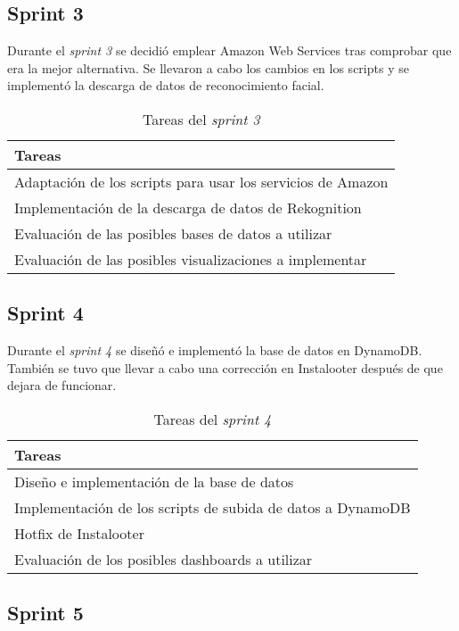 \subsection{Sprint 3}
Durante el \textit{sprint 3} se decidió emplear Amazon Web Services tras comprobar que era la mejor alternativa. Se llevaron a cabo los cambios en los scripts y se implementó la descarga de datos de reconocimiento facial.

\begin{table}[H]
    \centering
    \begin{tabular}{l}
    \hline
    \textbf{Tareas} \\ \hline
    Adaptación de los scripts para usar los servicios de Amazon \\
    Implementación de la descarga de datos de Rekognition \\
    Evaluación de las posibles bases de datos a utilizar \\
    Evaluación de las posibles visualizaciones a implementar \\ \hline
    \end{tabular}
    \caption{Tareas del \textit{sprint 3}}
    \label{tab:tasks_sprint3}
\end{table}

\subsection{Sprint 4}

Durante el \textit{sprint 4} se diseñó e implementó la base de datos en DynamoDB. También se tuvo que llevar a cabo una corrección en Instalooter después de que dejara de funcionar.

\begin{table}[H]
    \centering
    \begin{tabular}{l}
    \hline
    \textbf{Tareas} \\ \hline
    Diseño e implementación de la base de datos \\
    Implementación de los scripts de subida de datos a DynamoDB \\
    Hotfix de Instalooter \\
    Evaluación de los posibles dashboards a utilizar \\ \hline
    \end{tabular}
    \caption{Tareas del \textit{sprint 4}}
    \label{tab:tasks_sprint4}
\end{table}

\subsection{Sprint 5}

